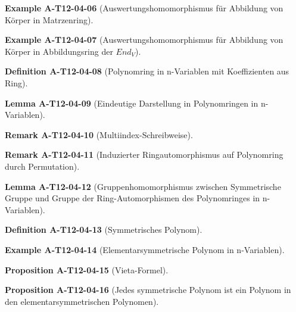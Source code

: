\documentclass[10pt, letterpaper]{article}
\newcommand{\CustomHeading}[3]{%
  \par\medskip\noindent%
  \textbf{#1 #2} \textnormal{(#3)}.\enskip%
}
\newenvironment{DEF}[2]{\CustomHeading{Definition}{#1}{#2}}{}
\newenvironment{PROP}[2]{\CustomHeading{Proposition}{#1}{#2}}{}
\newenvironment{LEM}[2]{\CustomHeading{Lemma}{#1}{#2}}{}
\newenvironment{REM}[2]{\CustomHeading{Remark}{#1}{#2}}{}
\newenvironment{EXA}[2]{\CustomHeading{Example}{#1}{#2}}{}
\begin{document}
\begin{EXA}{A-T12-04-06}{Auswertungshomomorphismus für Abbildung von Körper in Matrzenring}
\end{EXA}

\begin{EXA}{A-T12-04-07}{Auswertungshomomorphismus für Abbildung von Körper in Abbildungsring der $End_V$}
\end{EXA}

\begin{DEF}{A-T12-04-08}{Polynomring in n-Variablen mit Koeffizienten aus Ring}
\end{DEF}

\begin{LEM}{A-T12-04-09}{Eindeutige Darstellung in Polynomringen in n-Variablen}
\end{LEM}

\begin{REM}{A-T12-04-10}{Multiindex-Schreibweise}
\end{REM}

\begin{REM}{A-T12-04-11}{Induzierter Ringautomorphismus auf Polynomring durch Permutation}
\end{REM}

\begin{LEM}{A-T12-04-12}{Gruppenhomomorphismus zwischen Symmetrische Gruppe und Gruppe der Ring-Automorphismen des Polynomringes in n-Variablen}
\end{LEM}

\begin{DEF}{A-T12-04-13}{Symmetrisches Polynom}
\end{DEF}

\begin{EXA}{A-T12-04-14}{Elementarsymmetrische Polynom in n-Variablen}
\end{EXA}

\begin{PROP}{A-T12-04-15}{Vieta-Formel}
\end{PROP}

\begin{PROP}{A-T12-04-16}{Jedes symmetrische Polynom ist ein Polynom in den elementarsymmetrischen Polynomen}
\end{PROP}
\end{document}
